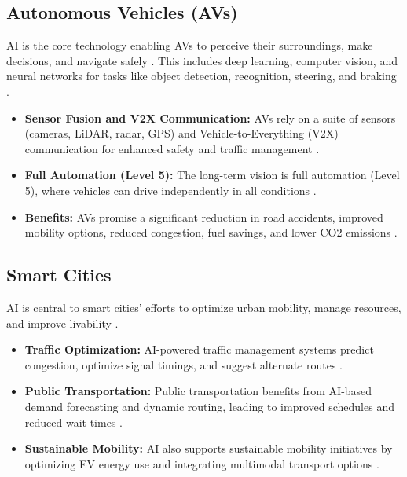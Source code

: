 \subsection{Autonomous Vehicles (AVs)}
AI is the core technology enabling AVs to perceive their surroundings, make decisions, and navigate safely \cite{StartusInsights_FutureTrends}. This includes deep learning, computer vision, and neural networks for tasks like object detection, recognition, steering, and braking \cite{CoherentMarketInsights_FutureTrends}.
\begin{itemize}
    \item \textbf{Sensor Fusion and V2X Communication:} AVs rely on a suite of sensors (cameras, LiDAR, radar, GPS) and Vehicle-to-Everything (V2X) communication for enhanced safety and traffic management \cite{AutomateOrg_FutureTrends}.
    \item \textbf{Full Automation (Level 5):} The long-term vision is full automation (Level 5), where vehicles can drive independently in all conditions \cite{GDSOnline_FutureTrends}.
    \item \textbf{Benefits:} AVs promise a significant reduction in road accidents, improved mobility options, reduced congestion, fuel savings, and lower CO2 emissions \cite{InclusionCloud_FutureTrends}.
\end{itemize}

\subsection{Smart Cities}
AI is central to smart cities' efforts to optimize urban mobility, manage resources, and improve livability \cite{PTVGroup_FutureTrends}.
\begin{itemize}
    \item \textbf{Traffic Optimization:} AI-powered traffic management systems predict congestion, optimize signal timings, and suggest alternate routes \cite{RSTSoftware_FutureTrends}.
    \item \textbf{Public Transportation:} Public transportation benefits from AI-based demand forecasting and dynamic routing, leading to improved schedules and reduced wait times \cite{Numalis_FutureTrends}.
    \item \textbf{Sustainable Mobility:} AI also supports sustainable mobility initiatives by optimizing EV energy use and integrating multimodal transport options \cite{InnovationNewsNetwork_FutureTrends}.
\end{itemize}

